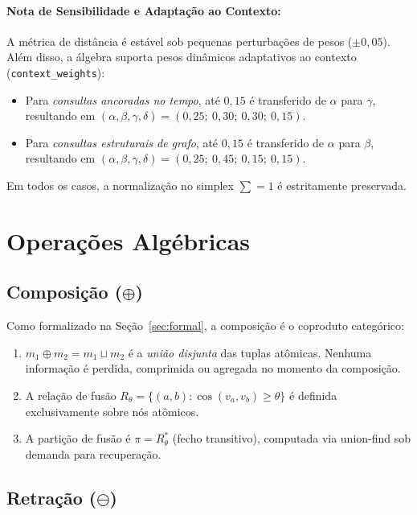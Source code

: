\documentclass[11pt,a4paper]{article}
\theoremstyle{definition}
\begin{document}
\paragraph{Nota de Sensibilidade e Adapta\c{c}\~ao ao Contexto:}
A m\'etrica de dist\^ancia \'e est\'avel sob pequenas perturba\c{c}\~oes de pesos ($\pm 0{,}05$). Al\'em disso, a \'algebra suporta pesos din\^amicos adaptativos ao contexto (\texttt{context\_weights}):
\begin{itemize}
    \item Para \emph{consultas ancoradas no tempo}, at\'e $0{,}15$ \'e transferido de $\alpha$ para $\gamma$, resultando em $(\alpha, \beta, \gamma, \delta) = (0{,}25;\ 0{,}30;\ 0{,}30;\ 0{,}15)$.
    \item Para \emph{consultas estruturais de grafo}, at\'e $0{,}15$ \'e transferido de $\alpha$ para $\beta$, resultando em $(\alpha, \beta, \gamma, \delta) = (0{,}25;\ 0{,}45;\ 0{,}15;\ 0{,}15)$.
\end{itemize}
Em todos os casos, a normaliza\c{c}\~ao no simplex $\sum = 1$ \'e estritamente preservada.

\section{Opera\c{c}\~oes Alg\'ebricas}\label{sec:operacoes}

\subsection{Composi\c{c}\~ao ($\oplus$)}

Como formalizado na Se\c{c}\~ao~\ref{sec:formal}, a composi\c{c}\~ao \'e o coproduto categ\'orico:
\begin{enumerate}
    \item $m_1 \oplus m_2 = m_1 \sqcup m_2$ \'e a \emph{uni\~ao disjunta} das tuplas at\^omicas. Nenhuma informa\c{c}\~ao \'e perdida, comprimida ou agregada no momento da composi\c{c}\~ao.
    \item A rela\c{c}\~ao de fus\~ao $R_\theta = \{(a,b) : \cos(v_a, v_b) \geq \theta\}$ \'e definida exclusivamente sobre n\'os at\^omicos.
    \item A parti\c{c}\~ao de fus\~ao \'e $\pi = R_\theta^*$ (fecho transitivo), computada via union-find sob demanda para recupera\c{c}\~ao.
\end{enumerate}

\subsection{Retra\c{c}\~ao ($\ominus$)}
\end{document}
